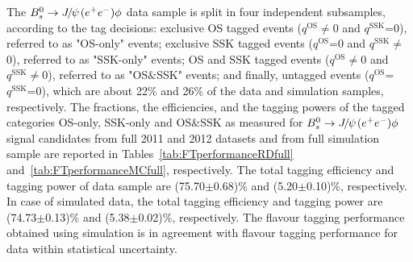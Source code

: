 The ${{B}^0_{s}}\rightarrow{\ensuremath{{J\mskip -3mu/\mskip -2mu\psi\mskip 2mu}}}({e^+e^-})\phi$ data sample is split in four independent subsamples, according to the tag decisions: exclusive OS tagged events ($q^{\text{OS}}\neq$0 and $q^{\text{SSK}}$=0), referred to as "OS-only" events; exclusive SSK tagged events ($q^{\text{OS}}$=0 and $q^{\text{SSK}}\neq$0), referred to as "SSK-only" events; OS and SSK tagged events ($q^{\text{OS}}\neq$0 and $q^{\text{SSK}}\neq$0), referred to as "OS$\&$SSK" events; and finally, untagged events ($q^{\text{OS}}$=$q^{\text{SSK}}$=0), which are about 22$\%$ and 26$\%$ of the data and simulation samples, respectively. The fractions, the efficiencies, and the tagging powers of the tagged categories OS-only, SSK-only and OS$\&$SSK as measured for ${{B}^0_{s}}\rightarrow{\ensuremath{{J\mskip -3mu/\mskip -2mu\psi\mskip 2mu}}}({e^+e^-})\phi$ signal candidates from full 2011 and 2012 datasets and from full simulation sample are reported in Tables~\ref{tab:FTperformanceRDfull} and~\ref{tab:FTperformanceMCfull}, respectively. The total tagging efficiency and tagging power of data sample are (75.70$\pm$0.68)$\%$ and (5.20$\pm$0.10)$\%$, respectively. In case of simulated data, the total tagging efficiency and tagging power are (74.73$\pm$0.13)$\%$ and (5.38$\pm$0.02)$\%$, respectively. The flavour tagging performance obtained using simulation is in agreement with flavour tagging performance for data within statistical uncertainty.

